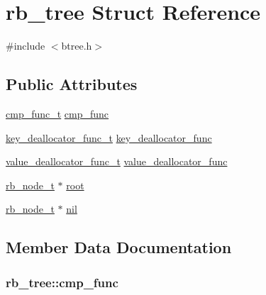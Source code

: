 \hypertarget{structrb__tree}{}\section{rb\+\_\+tree Struct Reference}
\label{structrb__tree}


{\ttfamily \#include $<$btree.\+h$>$}

\subsection*{Public Attributes}
\begin{DoxyCompactItemize}
\item 
\hyperlink{funcops_8h_a743855be725d982bdbf1b77fa50c7fb4}{cmp\+\_\+func\+\_\+t} \hyperlink{structrb__tree_a31036f5fcc11addc5ede902f4ad1c9b7}{cmp\+\_\+func}
\item 
\hyperlink{funcops_8h_a5e40dbb859d4ad69b1ce299ee1a89b2f}{key\+\_\+deallocator\+\_\+func\+\_\+t} \hyperlink{structrb__tree_a4c2d24d8fd4d72dcd2dc44fd9162da41}{key\+\_\+deallocator\+\_\+func}
\item 
\hyperlink{funcops_8h_ada2556f4131df1b522ae610503522842}{value\+\_\+deallocator\+\_\+func\+\_\+t} \hyperlink{structrb__tree_a287af0a50e7abbfe60cfac5cb38f9bdf}{value\+\_\+deallocator\+\_\+func}
\item 
\hyperlink{btree_8h_ab34c6f1239590f1b8d7aa8660b77c485}{rb\+\_\+node\+\_\+t} $\ast$ \hyperlink{structrb__tree_a360821baa8346c8daa0ed28665a010e5}{root}
\item 
\hyperlink{btree_8h_ab34c6f1239590f1b8d7aa8660b77c485}{rb\+\_\+node\+\_\+t} $\ast$ \hyperlink{structrb__tree_ab7b455b147b333e094aa204ee7db6011}{nil}
\end{DoxyCompactItemize}


\subsection{Member Data Documentation}
\hypertarget{structrb__tree_a31036f5fcc11addc5ede902f4ad1c9b7}{}
\subsubsection[{cmp\+\_\+func}]{ rb\+\_\+tree\+::cmp\+\_\+func}\label{structrb__tree_a31036f5fcc11addc5ede902f4ad1c9b7}
\hypertarget{structrb__tree_a4c2d24d8fd4d72dcd2dc44fd9162da41}{}
